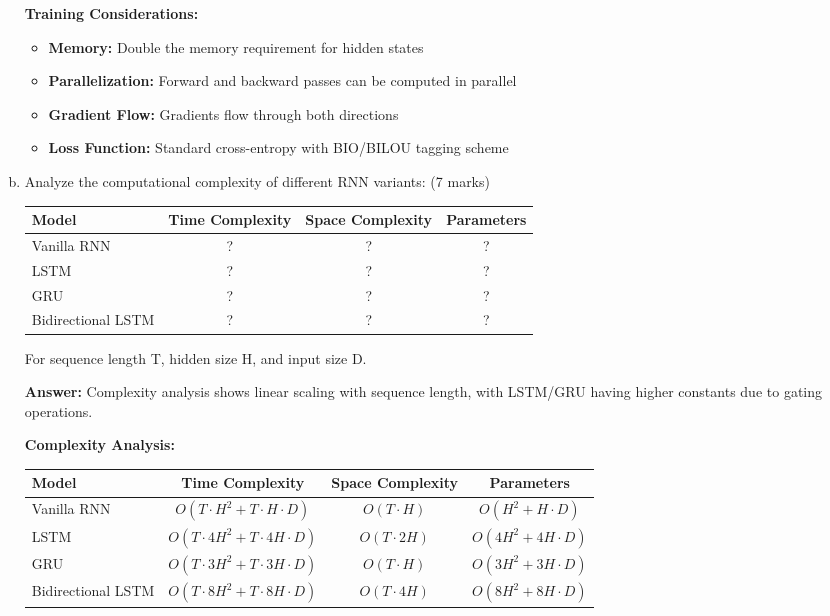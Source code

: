 \documentclass[12pt]{article}
\newcommand{\answer}[1]{{\color{answercolor}\textbf{Answer:} #1}}
\newcommand{\explanation}[1]{{\color{explanationcolor}#1}}
\begin{document}
\begin{enumerate}[(a)]
{    \textbf{Training Considerations:}
    \begin{itemize}
        \item \textbf{Memory:} Double the memory requirement for hidden states
        \item \textbf{Parallelization:} Forward and backward passes can be computed in parallel
        \item \textbf{Gradient Flow:} Gradients flow through both directions
        \item \textbf{Loss Function:} Standard cross-entropy with BIO/BILOU tagging scheme
    \end{itemize}
    }
    
    \item Analyze the computational complexity of different RNN variants: \hfill (7 marks)
    
    \begin{center}
    \begin{tabular}{|l|c|c|c|}
    \hline
    Model & Time Complexity & Space Complexity & Parameters \\
    \hline
    Vanilla RNN & ? & ? & ? \\
    LSTM & ? & ? & ? \\
    GRU & ? & ? & ? \\
    Bidirectional LSTM & ? & ? & ? \\
    \hline
    \end{tabular}
    \end{center}
    
    For sequence length T, hidden size H, and input size D.
    
    \answer{Complexity analysis shows linear scaling with sequence length, with LSTM/GRU having higher constants due to gating operations.}
    
    \explanation{
    \textbf{Complexity Analysis:}
    
    \begin{center}
    \begin{tabular}{|l|c|c|c|}
    \hline
    Model & Time Complexity & Space Complexity & Parameters \\
    \hline
    Vanilla RNN & $O(T \cdot H^2 + T \cdot H \cdot D)$ & $O(T \cdot H)$ & $O(H^2 + H \cdot D)$ \\
    LSTM & $O(T \cdot 4H^2 + T \cdot 4H \cdot D)$ & $O(T \cdot 2H)$ & $O(4H^2 + 4H \cdot D)$ \\
    GRU & $O(T \cdot 3H^2 + T \cdot 3H \cdot D)$ & $O(T \cdot H)$ & $O(3H^2 + 3H \cdot D)$ \\
    Bidirectional LSTM & $O(T \cdot 8H^2 + T \cdot 8H \cdot D)$ & $O(T \cdot 4H)$ & $O(8H^2 + 8H \cdot D)$ \\
    \hline
    \end{tabular}
    \end{center}
    
}
\end{enumerate}
\end{document}
